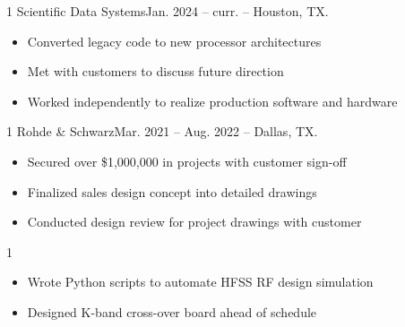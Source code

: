 \documentclass[10pt, letterpaper, ragged2e, withhyper]{AltaCV/altacv}
\def\Rohde{1}
\def\LMCO{1}
\def\SDS{1}
\begin{document}


\makecvheader


\begin{paracol}{2}



\if\SDS1
 {Scientific Data Systems}{Jan. 2024 -- curr. -- Houston, TX.}{}
\begin{itemize}
\item Converted legacy code to new processor architectures
\item Met with customers to discuss future direction
\item Worked independently to realize production software and hardware
\end{itemize}
\divider
\fi


\if\Rohde1
 {Rohde \& Schwarz}{Mar. 2021 -- Aug. 2022 -- Dallas, TX.}{}
\begin{itemize}
\item Secured over \$1,000,000 in projects with customer sign-off
\item Finalized sales design concept into detailed drawings
\item Conducted design review for project drawings with customer
\end{itemize}
\divider
\fi

\if\LMCO1
 {}
\begin{itemize}
\item Wrote Python scripts to automate HFSS RF design simulation
\item Designed K-band cross-over board ahead of schedule
\end{itemize}
\fi



\end{paracol}
\end{document}
